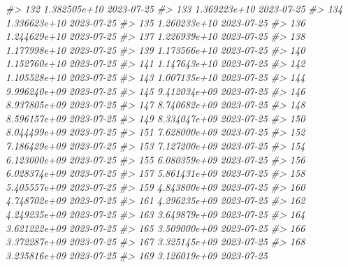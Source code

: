 \documentclass[
  xelatex, ja=standard]{bxjsbook}
\newenvironment{Shaded}{\begin{snugshade}}{\end{snugshade}}
\newcommand{\CommentTok}[1]{\textcolor[rgb]{0.56,0.35,0.01}{\textit{#1}}}
\theoremstyle{definition}
\theoremstyle{definition}
\theoremstyle{definition}
\theoremstyle{definition}
\theoremstyle{remark}
\begin{document}
\begin{Shaded}
\begin{Highlighting}[]
\CommentTok{\#\textgreater{} 132 1.382505e+10         2023{-}07{-}25}
\CommentTok{\#\textgreater{} 133 1.369223e+10         2023{-}07{-}25}
\CommentTok{\#\textgreater{} 134 1.336623e+10         2023{-}07{-}25}
\CommentTok{\#\textgreater{} 135 1.260233e+10         2023{-}07{-}25}
\CommentTok{\#\textgreater{} 136 1.244629e+10         2023{-}07{-}25}
\CommentTok{\#\textgreater{} 137 1.226939e+10         2023{-}07{-}25}
\CommentTok{\#\textgreater{} 138 1.177998e+10         2023{-}07{-}25}
\CommentTok{\#\textgreater{} 139 1.173566e+10         2023{-}07{-}25}
\CommentTok{\#\textgreater{} 140 1.152760e+10         2023{-}07{-}25}
\CommentTok{\#\textgreater{} 141 1.147643e+10         2023{-}07{-}25}
\CommentTok{\#\textgreater{} 142 1.105528e+10         2023{-}07{-}25}
\CommentTok{\#\textgreater{} 143 1.007135e+10         2023{-}07{-}25}
\CommentTok{\#\textgreater{} 144 9.996240e+09         2023{-}07{-}25}
\CommentTok{\#\textgreater{} 145 9.412034e+09         2023{-}07{-}25}
\CommentTok{\#\textgreater{} 146 8.937805e+09         2023{-}07{-}25}
\CommentTok{\#\textgreater{} 147 8.740682e+09         2023{-}07{-}25}
\CommentTok{\#\textgreater{} 148 8.596157e+09         2023{-}07{-}25}
\CommentTok{\#\textgreater{} 149 8.334047e+09         2023{-}07{-}25}
\CommentTok{\#\textgreater{} 150 8.044499e+09         2023{-}07{-}25}
\CommentTok{\#\textgreater{} 151 7.628000e+09         2023{-}07{-}25}
\CommentTok{\#\textgreater{} 152 7.186429e+09         2023{-}07{-}25}
\CommentTok{\#\textgreater{} 153 7.127200e+09         2023{-}07{-}25}
\CommentTok{\#\textgreater{} 154 6.123000e+09         2023{-}07{-}25}
\CommentTok{\#\textgreater{} 155 6.080359e+09         2023{-}07{-}25}
\CommentTok{\#\textgreater{} 156 6.028374e+09         2023{-}07{-}25}
\CommentTok{\#\textgreater{} 157 5.861431e+09         2023{-}07{-}25}
\CommentTok{\#\textgreater{} 158 5.405557e+09         2023{-}07{-}25}
\CommentTok{\#\textgreater{} 159 4.843800e+09         2023{-}07{-}25}
\CommentTok{\#\textgreater{} 160 4.748702e+09         2023{-}07{-}25}
\CommentTok{\#\textgreater{} 161 4.296235e+09         2023{-}07{-}25}
\CommentTok{\#\textgreater{} 162 4.249235e+09         2023{-}07{-}25}
\CommentTok{\#\textgreater{} 163 3.649879e+09         2023{-}07{-}25}
\CommentTok{\#\textgreater{} 164 3.621222e+09         2023{-}07{-}25}
\CommentTok{\#\textgreater{} 165 3.509000e+09         2023{-}07{-}25}
\CommentTok{\#\textgreater{} 166 3.372287e+09         2023{-}07{-}25}
\CommentTok{\#\textgreater{} 167 3.325145e+09         2023{-}07{-}25}
\CommentTok{\#\textgreater{} 168 3.235816e+09         2023{-}07{-}25}
\CommentTok{\#\textgreater{} 169 3.126019e+09         2023{-}07{-}25}

\end{Highlighting}
\end{Shaded}
\end{document}
